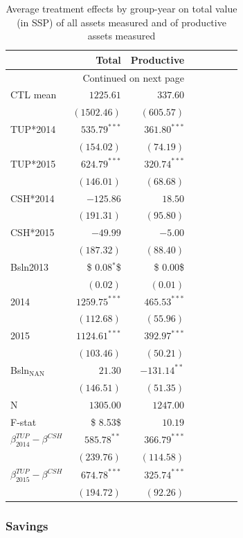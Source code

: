 \documentclass[12pt,article]{article}
\begin{document}
\begin{longtable}{lrrrrrrr}
\caption{\label{tab:assets}Average treatment effects by group-year on total value (in SSP) of all assets measured and of productive assets measured}
\\
\hline
 & Total & Productive\\
\hline
\endhead
\hline\multicolumn{3}{r}{Continued on next page} \\
\endfoot
\endlastfoot
CTL mean & $1225.61$ & $337.60$\\
 & $(1502.46)$ & $(605.57)$\\
\hline
TUP*2014 & $535.79^{***}$ & $361.80^{***}$\\
 & $(154.02)$ & $(74.19)$\\
TUP*2015 & $624.79^{***}$ & $320.74^{***}$\\
 & $(146.01)$ & $(68.68)$\\
CSH*2014 & $-125.86$ & $18.50$\\
 & $(191.31)$ & $(95.80)$\\
CSH*2015 & $-49.99$ & $-5.00$\\
 & $(187.32)$ & $(88.40)$\\
Bsln2013 & \$ 0.08$^{\textbf{*}}$\$ & \$ 0.00\$\\
 & $( 0.02)$ & $( 0.01)$\\
2014 & $1259.75^{***}$ & $465.53^{***}$\\
 & $(112.68)$ & $(55.96)$\\
2015 & $1124.61^{***}$ & $392.97^{***}$\\
 & $(103.46)$ & $(50.21)$\\
Bsln$_{\text{NAN}}$ & $21.30$ & $-131.14^{**}$\\
 & $(146.51)$ & $(51.35)$\\
\hline
N & $1305.00$ & $1247.00$\\
F-stat & \$ 8.53\$ & $10.19$\\
\hline
$\beta^{TUP}_{2014}-\beta^{CSH}$ & $585.78^{**}$ & $366.79^{***}$\\
 & $(239.76)$ & $(114.58)$\\
$\beta^{TUP}_{2015}-\beta^{CSH}$ & $674.78^{***}$ & $325.74^{***}$\\
 & $(194.72)$ & $(92.26)$\\
\hline
\end{longtable}


\subsubsection{Savings}
\label{sec-3-4-2}
\end{document}
